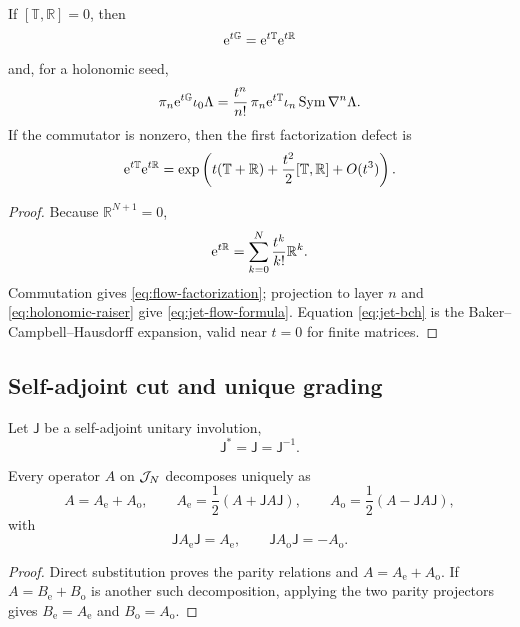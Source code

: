 \begin{theorem}
If $[\mathbb T,\mathbb R]=0$, then
\begin{equation}
\mathrm e^{t\mathbb G}=\mathrm e^{t\mathbb T}\mathrm e^{t\mathbb R}
\label{eq:flow-factorization}
\end{equation}
and, for a holonomic seed,
\begin{equation}
\pi_n\mathrm e^{t\mathbb G}\iota_0\Lambda
=\frac{t^n}{n!}\,
\pi_n\mathrm e^{t\mathbb T}\iota_n\operatorname{Sym}\nabla^n\Lambda.
\label{eq:jet-flow-formula}
\end{equation}
If the commutator is nonzero, then the first factorization defect is
\begin{equation}
\mathrm e^{t\mathbb T}\mathrm e^{t\mathbb R}
=\exp\left(
 t(\mathbb T+\mathbb R)
 +\frac{t^2}{2}[\mathbb T,\mathbb R]
 +O(t^3)
\right).
\label{eq:jet-bch}
\end{equation}
\end{theorem}

\begin{proof}
Because $\mathbb R^{N+1}=0$,
\[
\mathrm e^{t\mathbb R}=\sum_{k=0}^N\frac{t^k}{k!}\mathbb R^k.
\]
Commutation gives \eqref{eq:flow-factorization}; projection to layer $n$ and \eqref{eq:holonomic-raiser} give \eqref{eq:jet-flow-formula}.  Equation \eqref{eq:jet-bch} is the Baker--Campbell--Hausdorff expansion, valid near $t=0$ for finite matrices.
\end{proof}

\subsection{Self-adjoint cut and unique grading}

Let $\mathsf J$ be a self-adjoint unitary involution,
\begin{equation}
\mathsf J^*=\mathsf J=\mathsf J^{-1}.
\label{eq:selfadjoint-cut}
\end{equation}

\begin{theorem}
Every operator $A$ on $\mathcal J_N$ decomposes uniquely as
\[
A=A_{\mathrm e}+A_{\mathrm o},
\qquad
A_{\mathrm e}=\frac12(A+\mathsf J A\mathsf J),
\qquad
A_{\mathrm o}=\frac12(A-\mathsf J A\mathsf J),
\]
with
\[
\mathsf J A_{\mathrm e}\mathsf J=A_{\mathrm e},
\qquad
\mathsf J A_{\mathrm o}\mathsf J=-A_{\mathrm o}.
\]
\end{theorem}

\begin{proof}
Direct substitution proves the parity relations and $A=A_{\mathrm e}+A_{\mathrm o}$.  If $A=B_{\mathrm e}+B_{\mathrm o}$ is another such decomposition, applying the two parity projectors gives $B_{\mathrm e}=A_{\mathrm e}$ and $B_{\mathrm o}=A_{\mathrm o}$.
\end{proof}

